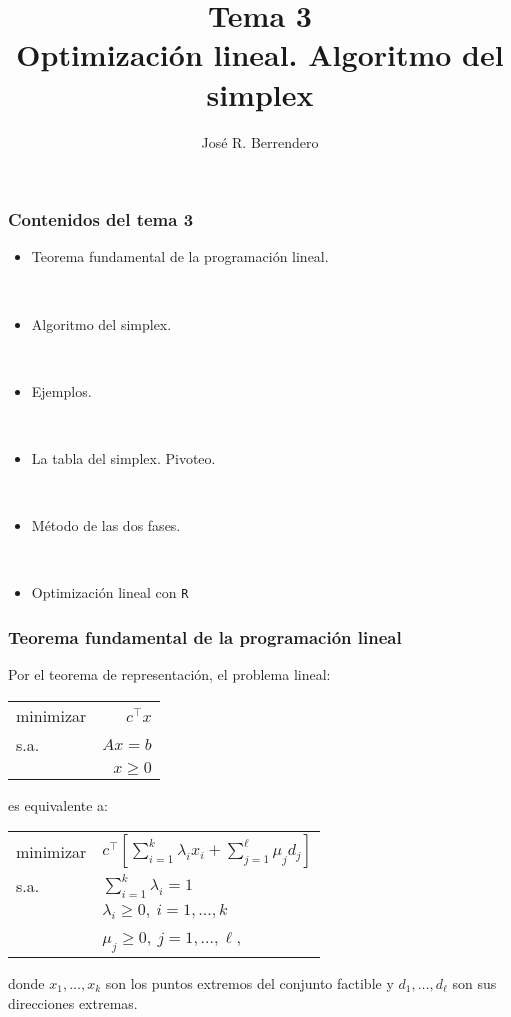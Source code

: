 \documentclass{beamer}
\title[Estad\'{\i}stica: Tema 3]{Tema 3\\
 Optimización lineal. Algoritmo del simplex}
\author[Berrendero]
{Jos\'{e} R. Berrendero}
\date{}
\institute{Departamento de Matem\'{a}ticas\\
 Universidad Aut\'{o}noma de Madrid}
\begin{document}
\frame{\titlepage}

\begin{frame}[plain]
\frametitle{Contenidos del tema 3}

\begin{itemize}
 
  \item Teorema fundamental de la programación lineal.
  
\  
  
  \item Algoritmo del simplex.

\  
  
  \item Ejemplos.
  
\  
  
  \item La tabla del simplex. Pivoteo.
  
\  
  
  \item Método de las dos fases.
  
  \
  
  \item Optimización lineal con {\tt R}
 
\end{itemize}


\end{frame}
\begin{frame}
\frametitle{Teorema fundamental de la programación lineal}

Por el teorema de representación, el problema lineal:

\begin{center}
\begin{tabular}{lr}
minimizar & $c^\top x$ \\
s.a. & $Ax=b$   \\
	 & $x\geq 0$
\end{tabular}
\end{center}

es equivalente a: 

\begin{center}
\begin{tabular}{ll}
minimizar & $c^\top \left[\sum_{i=1}^k \lambda_i x_i + \sum_{j=1}^\ell
 \mu_j d_j\right]$ \\
s.a. & $\sum_{i=1}^k \lambda_i=1$   \\
	 & $\lambda_i\geq 0,\ i=1,\ldots,k$\\
	 & $\mu_j\geq 0,\ j=1,\ldots,\ell$,
\end{tabular}
\end{center}
donde $x_1,\ldots, x_k$ son los puntos extremos del conjunto factible y  $d_1,\ldots,d_\ell$ son sus direcciones extremas.


\end{frame}
\end{document}
